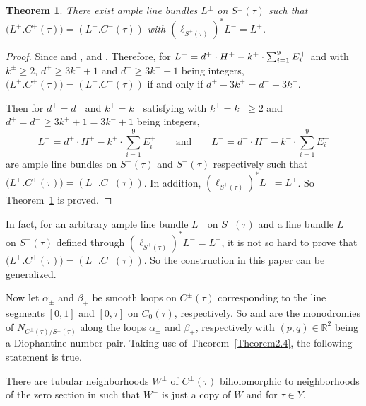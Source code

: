 \documentclass[pdftex]{sigma}
\numberwithin{equation}{section}
\newtheorem{Theorem}{Theorem}[section]
\begin{document}
\begin{Theorem} \label{Theorem2.6}
There exist ample line bundles $L^{\pm}$ on $S^{\pm}(\tau)$ such that $\bigl(L^{+}.C^{+}(\tau)\bigr)\!=\!(L^{-}.C^{-}(\tau))$ with $(\ell_{S^{+}(\tau)})^*L^{-}=L^{+}$.
\end{Theorem}

\begin{proof}
Since  and ,  and . Therefore, for $L^{+}=d^{+}\cdot H^{+}-k^{+} \cdot \smash{\sum _{i=1}^9 E_i^{+}}$ and  with $k^{\pm}\geq2$, $d^{+} \geq 3k^{+}+1 $ and $d^{-} \geq 3k^{-}+1 $ being integers, $\bigl(L^{+}.C^{+}(\tau)\bigr)=(L^{-}.C^{-}(\tau))$ if and only if $d^{+}-3k^{+}=d^{-}-3k^{-}$.

Then for $d^{+}=d^{-}$ and $k^{+}=k^{-}$ satisfying  with $k^{+}=k^{-}\geq 2$ and $d^{+}=d^{-}\geq 3k^{+}+1=3k^{-}+1$ being integers,
\[
L^{+}=d^{+}\cdot H^{+}-k^{+}\cdot\sum _{i=1}^9 E_i^{+}\qquad \text{and}\qquad L^{-}=d^{-}\cdot H^{-}-k^{-}\cdot\sum _{i=1}^9 E_i^{-}\]
 are ample line bundles on $S^{+}(\tau)$ and $S^{-}(\tau)$ respectively such that $\bigl(L^{+}.C^{+}(\tau)\bigr)=(L^{-}.C^{-}(\tau))$. In addition, $(\ell_{S^{+}(\tau)})^*L^{-}=L^{+}$. So Theorem~\ref{Theorem2.6} is proved.
\end{proof}


In fact, for an arbitrary ample line bundle $L^+$ on $S^+(\tau)$ and a line bundle $L^-$ on $S^-(\tau)$ defined through $(\ell_{S^{+}(\tau)})^*L^{-}=L^{+}$, it is not so hard to prove that $\bigl(L^{+}.C^{+}(\tau)\bigr)=(L^{-}.C^{-}(\tau))$. So the construction in this paper can be generalized.

Now let $\alpha_{\pm}$ and $\beta_{\pm}$ be smooth loops on $C^{\pm}(\tau)$ corresponding to the line segments $[0,1]$ and $[0,\tau]$ on $C_0(\tau)$, respectively. So  and  are the monodromies of $N_{C^{\pm}(\tau)/S^{\pm}(\tau)}$ along the loops $\alpha_{\pm}$ and $\beta_{\pm}$, respectively with $(p,q) \in \mathbb{R}^2$ being a Diophantine number pair. Taking use of Theorem~\ref{Theorem2.4}, the following statement is true.

There are tubular neighborhoods $W^{\pm}$ of $C^{\pm}(\tau)$ biholomorphic to neighborhoods of the zero section in  such that $W^+$ is just a copy of $W$ and  for $\tau\in Y$.
\end{document}
